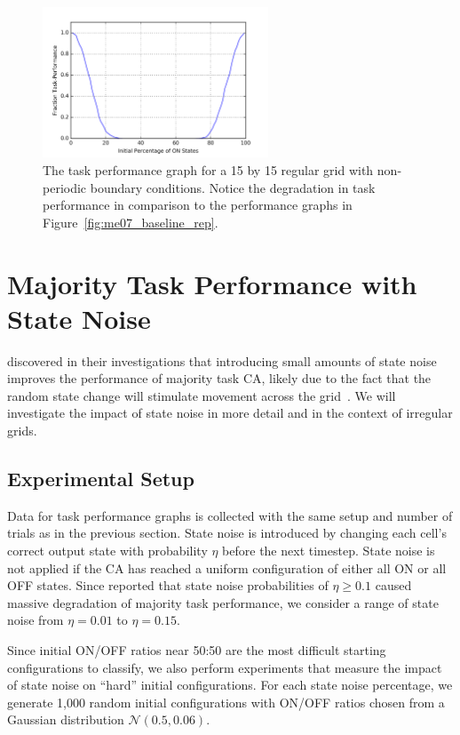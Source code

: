 \documentclass[a4paper,11pt,twoside]{report}
\begin{document}
\begin{figure}[htp]
\centering
\includegraphics[width=0.6\textwidth]{ch5_figs/lm_baseline_reg_nontor}
\caption[Local Majority Task Performance on a Non-Periodic Regular Grid]{
  The task performance graph for a 15 by 15 regular grid with non-periodic boundary conditions. Notice the degradation in task performance in comparison to the performance graphs in Figure~\ref{fig:me07_baseline_rep}.
}
\label{fig:lm_reg_nonper}
\end{figure}

\section{Majority Task Performance with State Noise}

\citeauthor{me07} discovered in their investigations that introducing small amounts of state noise improves the performance of majority task CA, likely due to the fact that the random state change will stimulate movement across the grid~\cite{me07}. We will investigate the impact of state noise in more detail and in the context of irregular grids. 

\subsection*{Experimental Setup}

Data for task performance graphs is collected with the same setup and number of trials as in the previous section. State noise is introduced by changing each cell's correct output state with probability $\eta$ before the next timestep. State noise is not applied if the CA has reached a uniform configuration of either all ON or all OFF states. Since \citeauthor{me07} reported that state noise probabilities of $\eta \ge 0.1$ caused massive degradation of majority task performance, we consider a range of state noise from $\eta=0.01$ to $\eta=0.15$.

Since initial ON/OFF ratios near 50:50 are the most difficult starting configurations to classify, we also perform experiments that measure the impact of state noise on ``hard'' initial configurations. For each state noise percentage, we generate 1,000 random initial configurations with ON/OFF ratios chosen from a Gaussian distribution $\mathcal{N}(0.5, 0.06)$.
\end{document}
